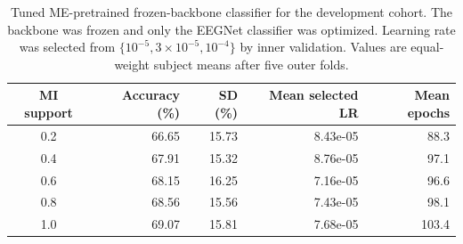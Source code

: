 \begin{table}[!t]
\caption{Tuned ME-pretrained frozen-backbone classifier for the development cohort. The backbone was frozen and only the EEGNet classifier was optimized. Learning rate was selected from $\{10^{-5},3\times10^{-5},10^{-4}\}$ by inner validation. Values are equal-weight subject means after five outer folds.}
\label{tab:n3_tuned_finetune}
\centering
\scriptsize
\begin{tabular}{c r r r r}
\toprule
MI support & Accuracy (\%) & SD (\%) & Mean selected LR & Mean epochs \\
\midrule
0.2 & 66.65 & 15.73 & 8.43e-05 & 88.3 \\
0.4 & 67.91 & 15.32 & 8.76e-05 & 97.1 \\
0.6 & 68.15 & 16.25 & 7.16e-05 & 96.6 \\
0.8 & 68.56 & 15.56 & 7.43e-05 & 98.1 \\
1.0 & 69.07 & 15.81 & 7.68e-05 & 103.4 \\
\bottomrule
\end{tabular}
\end{table}